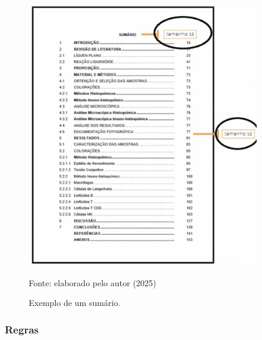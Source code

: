 \begin{figure}[ht]
    \centering
    \begin{small}
        \caption{Exemplo de um sumário.}
        \includegraphics[width=0.9\textwidth]{Figuras/exemplo_sumario.png} %
        \label{fig:exemplo_sumario}

        Fonte: elaborado pelo autor (2025)
    \end{small}
\end{figure}

\newpage

\subsubsection{Regras}

